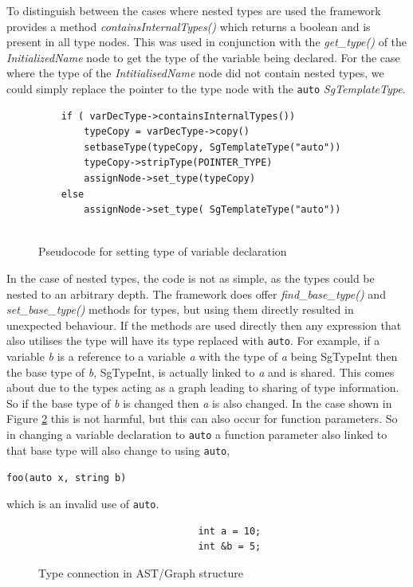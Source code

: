 \documentclass[bsc,frontabs,singlespacing,twoside,parskip,deptreport]{infthesis}
\begin{document}
To distinguish between the cases where nested types are used the framework provides a method \textit{containsInternalTypes()} which returns a boolean and is present in all type nodes. This was used in conjunction with the \textit{get\_type()} of the \textit{InitializedName} node to get the type of the variable being declared. For the case where the type of the \textit{IntitialisedName} node did not contain nested types, we could simply replace the pointer to the type node with the \texttt{auto} \textit{SgTemplateType}. 

\begin{figure}[H]
    \centering
    \begin{verbatim}
    if ( varDecType->containsInternalTypes())
        typeCopy = varDecType->copy()
        setbaseType(typeCopy, SgTemplateType("auto"))
        typeCopy->stripType(POINTER_TYPE)
        assignNode->set_type(typeCopy)
    else
        assignNode->set_type( SgTemplateType("auto"))
    
    \end{verbatim}
    \caption{Pseudocode for setting type of variable declaration}
    \label{fig:auto-cases-nested-types}
\end{figure}

In the case of nested types, the code is not as simple, as the types could be nested to an arbitrary depth. The framework does offer \textit{find\_base\_type()} and \textit{set\_base\_type()} methods for types, but using them directly resulted in unexpected behaviour. If the methods are used directly then any expression that also utilises the type will have its type replaced with \texttt{auto}. For example, if a variable \textit{b} is a reference to a variable \textit{a} with the type of \textit{a} being SgTypeInt then the base type of \textit{b}, SgTypeInt, is actually linked to \textit{a} and is shared. This comes about due to the types acting as a graph leading to sharing of type information. So if the base type of \textit{b} is changed then \textit{a} is also changed. In the case shown in Figure \ref{fig:type-con-bug} this is not harmful, but this can also occur for function parameters. So in changing a variable declaration to \texttt{auto} a function parameter also linked to that base type will also change to using \texttt{auto},
\begin{center}
    \texttt{foo(auto x, string b)}
\end{center}
which is an invalid use of \texttt{auto}.

\begin{figure}[!h]
    \begin{verbatim}
                            int a = 10;
                            int &b = 5;  
    \end{verbatim}
    \caption{Type connection in AST/Graph structure}
    \centering
    \label{fig:type-con-bug}
\end{figure}
\end{document}
